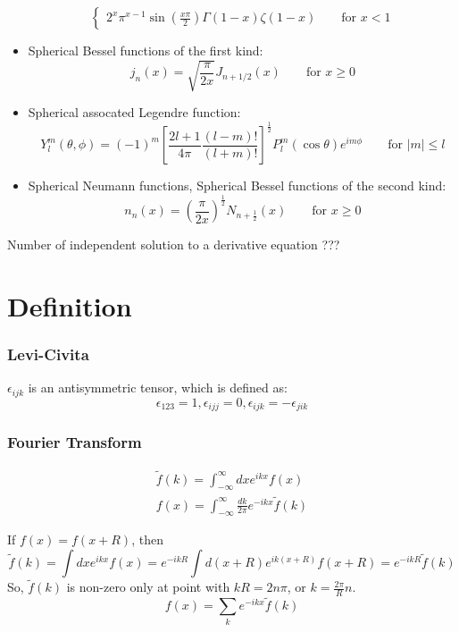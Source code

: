 \begin{itemize}
$$\begin{cases}
		2^x \pi^{x-1}\sin\left( \frac{x\pi}{2} \right)\Gamma(1-x)\zeta(1-x) \qquad \text{for } x < 1
	    \end{cases}
	    $$
	\item Spherical Bessel functions of the first kind:
	    $$ j_n(x) = \sqrt{\frac{\pi}{2x}} J_{n+1/2}(x)  \qquad \text{for } x \ge 0$$
	\item Spherical assocated Legendre function:
	    $$ Y_l^m(\theta, \phi) = (-1)^m \left[ \frac{2l+1}{4\pi} \frac{(l-m)!}{(l+m)!}\right]^{\frac{1}{2}} P_l^m(\cos\theta)e^{im\phi} \qquad \text{for } |m| \le l$$
	\item Spherical Neumann functions, Spherical Bessel functions of the second kind:
	    $$ n_n(x) = \left(\frac{\pi}{2x} \right)^{\frac{1}{2}} N_{n+\frac{1}{2}}(x)	\qquad \text{for } x \ge 0 $$
\end{itemize}
Number of independent solution to a derivative equation ???
\section{Definition}

\subsubsection{Levi-Civita}
$\epsilon_{ijk}$ is an antisymmetric tensor, which is defined as: 
\begin{equation}
    \label{eqn:math::Levi-Civita}
    \epsilon_{123} = 1, \epsilon_{ijj} = 0, \epsilon_{ijk} = -\epsilon_{jik}
\end{equation}

\subsubsection{Fourier Transform}
\begin{equation}
    \label{eqn:math::FT}
    \begin{gathered}
    \displaystyle \tilde{f}(k) = \int_{-\infty}^{\infty}dx e^{ikx}f(x)	\\
    \displaystyle f(x) = \int_{-\infty}^{\infty}\frac{dk}{2\pi}e^{-ikx}\tilde{f}(k)
    \end{gathered}
\end{equation}

If $f(x) = f(x+R)$, then 
\begin{equation}
    \tilde{f}(k) = \int dx e^{ikx}f(x) = e^{-ikR} \int d(x+R) e^{ik(x+R)}f(x+R) = e^{-ikR} \tilde{f}(k)
\end{equation}
So, $\tilde{f}(k)$ is non-zero only at point with $kR = 2n\pi$, or $k = \frac{2\pi}{R}n$.
\begin{equation}
    \displaystyle f(x) = \sum_{k} e^{-ikx}\tilde{f}(k)
\end{equation}

